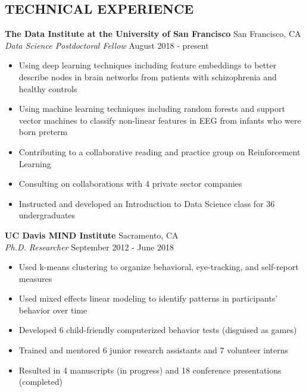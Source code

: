\documentclass[line,margin,10pt]{res}
\begin{document}
\begin{resume}
\section{TECHNICAL EXPERIENCE}
\textbf{The Data Institute at the University of San Francisco} \hfill San Francisco, CA \\
{\sl Data Science Postdoctoral Fellow} \hfill August 2018 - present
\begin{itemize} \itemsep -2pt
\item Using deep learning techniques including feature embeddings to better describe nodes in brain networks from patients with schizophrenia and healthy controls
\item Using machine learning techniques including random forests and support vector machines to classify non-linear features in EEG from infants who were born preterm
\item Contributing to a collaborative reading and practice group on Reinforcement Learning
\item Consulting on collaborations with 4 private sector companies
\item Instructed and developed an Introduction to Data Science class for 36 undergraduates
\end{itemize}

\textbf{UC Davis MIND Institute} \hfill Sacramento, CA \\
{\sl Ph.D. Researcher} \hfill September 2012 - June 2018
\begin{itemize} \itemsep -2pt
\item Used k-means clustering to organize behavioral, eye-tracking, and self-report measures
\item Used mixed effects linear modeling to identify patterns in participants' behavior over time
\item Developed 6 child-friendly computerized behavior tests (disguised as games)
\item Trained and mentored 6 junior research assistants and 7 volunteer interns
\item Resulted in 4 manuscripts (in progress) and 18 conference presentations (completed)
\end{itemize}


\end{resume}
\end{document}
